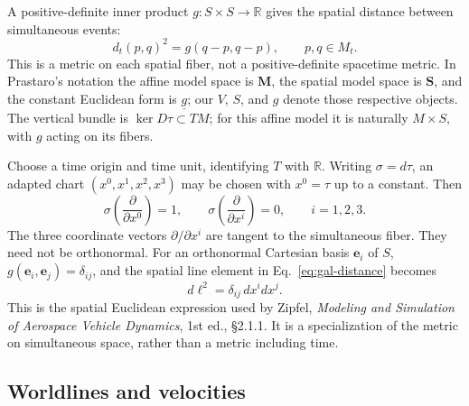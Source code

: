 A positive-definite inner product $g:S\times S\to\mathbb R$ gives the
spatial distance between simultaneous events:
\begin{equation}\label{eq:gal-distance}
 d_t(p,q)^2=g(q-p,q-p),\qquad p,q\in M_t.
\end{equation}
This is a metric on each spatial fiber, not a positive-definite spacetime
metric.  In Prastaro's notation the affine model space is $\mathbf M$, the
spatial model space is $\mathbf S$, and the constant Euclidean form is
$\underline g$; our $V$, $S$, and $g$ denote those respective objects.
The vertical bundle is $\ker D\tau\subset TM$; for this affine model it
is naturally $M\times S$, with $g$ acting on its fibers.

Choose a time origin and time unit, identifying $T$ with $\mathbb R$.
Writing $\sigma=d\tau$, an adapted chart $(x^0,x^1,x^2,x^3)$ may be
chosen with $x^0=\tau$ up to a constant.  Then
\begin{equation}\label{eq:gal-adapted}
 \sigma\!\left(\frac{\partial}{\partial x^0}\right)=1,
 \qquad
 \sigma\!\left(\frac{\partial}{\partial x^i}\right)=0,
 \qquad i=1,2,3.
\end{equation}
The three coordinate vectors $\partial/\partial x^i$ are tangent to the
simultaneous fiber.  They need not be orthonormal.  For an orthonormal
Cartesian basis $\mathbf e_i$ of $S$, $g(\mathbf e_i,\mathbf e_j)=\delta_{ij}$,
and the spatial line element in Eq.~\eqref{eq:gal-distance} becomes
\begin{equation}\label{eq:gal-cartesian-metric}
 d\ell^2=\delta_{ij}\,dx^i dx^j.
\end{equation}
This is the spatial Euclidean expression used by Zipfel, \emph{Modeling and
Simulation of Aerospace Vehicle Dynamics}, 1st ed., \S2.1.1.  It is a
specialization of the metric on simultaneous space, rather than a metric
including time.

\subsection{Worldlines and velocities}

